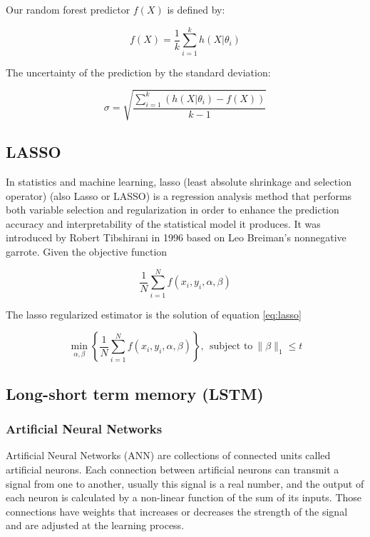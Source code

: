 \documentclass[12pt]{report}
\begin{document}
Our random forest predictor $f(X)$ is defined by:

$$f(X) = \dfrac{1}{k} \sum_{i=1}^{k} h(X|\theta_i)$$

The uncertainty of the prediction by the standard deviation:

$$\sigma = \sqrt{\dfrac{\sum_{i=1}^{k} (h(X|\theta_i) - f(X))}{k-1}}$$

\subsection{LASSO}
 
 In statistics and machine learning, lasso (least absolute shrinkage and selection operator)
 (also Lasso or LASSO) is a regression analysis method that performs both variable selection and
 regularization in order to enhance the prediction accuracy and interpretability of the statistical
 model it produces. It was introduced by Robert Tibshirani in 1996 based on Leo Breiman’s
 nonnegative garrote.
Given the objective function

\begin{equation}
\dfrac{1}{N} \sum_{i=1}^{N} f(x_i,y_i,\alpha,\beta)
\end{equation}
 
The lasso regularized estimator is the solution of equation \ref{eq:lasso}

\begin{equation}
\min_{\alpha, \beta} \left \{ \dfrac{1}{N} \sum_{i=1}^{N} f(x_i,y_i,\alpha,\beta)  \right \}, \ \ \text{subject to} \ \| \beta \|_{1} \leq t 
\label{eq:lasso}
\end{equation}


\subsection{Long-short term memory (LSTM)}

\subsubsection{Artificial Neural Networks}

Artificial Neural Networks (ANN) are collections of connected units called artificial neurons. Each connection between artificial neurons can transmit a signal from one to another, usually this signal is a real number, and the output of each neuron is calculated by a non-linear function of the sum of its inputs.
Those connections have weights that increases or decreases the strength of the signal and are adjusted at the learning process. 
\end{document}
